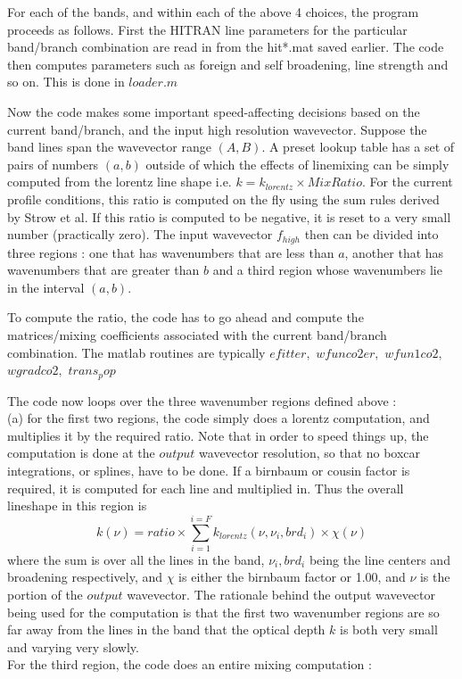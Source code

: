\documentclass[11pt]{article}
\begin{document}
For each of the bands, and within each of the above 4 choices, the program 
proceeds as follows. First the HITRAN line parameters for the particular 
band/branch combination are read in from the hit*.mat saved earlier. The 
code then computes parameters such as foreign and self broadening, line 
strength and so on. This is done in $loader.m$ 

Now the code makes some important speed-affecting decisions based
on the current band/branch, and the input high resolution wavevector.
Suppose the band lines span the wavevector range $(A,B)$. A preset
lookup table has a set of pairs of numbers $(a,b)$ outside of which the 
effects of linemixing can be simply computed from the lorentz line shape 
i.e. $k = k_{lorentz} \times MixRatio$. For the current profile 
conditions, this 
ratio is computed on the fly using the sum rules derived by Strow et al. 
If this ratio is computed to be negative, it is reset to a very small number
(practically zero). The input wavevector $f_{high}$ then can be divided 
into three regions : one that has wavenumbers 
that are less than $a$, another that has wavenumbers that are greater than 
$b$ and a third region whose wavenumbers lie in the interval $(a,b)$.

To compute the  ratio, the code has to go ahead and compute the 
matrices/mixing coefficients associated with the current band/branch 
combination. The matlab routines are typically $efitter,$ $wfunco2er,$ 
$wfun1co2,$ $wgradco2,$ $trans_pop$

The code now loops over the three wavenumber regions defined above :\\
(a) for the first two regions, the code simply does a lorentz computation, 
    and multiplies it by the required ratio. Note that in order to speed 
    things up, the computation is done at the $output$ wavevector 
    resolution, so that no boxcar integrations, or splines, have to be 
    done. If a birnbaum or cousin factor is required, it is computed for 
    each line and multiplied in. Thus the overall lineshape in this 
    region is
    \begin{equation}
 k(\nu) = ratio \times \sum_{i=1}^{i=F} k_{lorentz}(\nu,\nu_{i},brd_{i}) 
 \times \chi(\nu)
  \end{equation}
   where the sum is over all the lines in the band, $\nu_{i},brd_{i}$ 
   being the line centers and broadening respectively, and $\chi$ is 
   either the birnbaum factor or 1.00, and $\nu$ is the portion of the 
   $output$ wavevector. The rationale behind the output wavevector being 
   used for the computation is that the first two wavenumber regions are 
   so far away from the lines in the band that the optical depth $k$ is 
   both very small and varying very slowly.\\
  For the third region, the code does an entire mixing computation : \\
\end{document}

